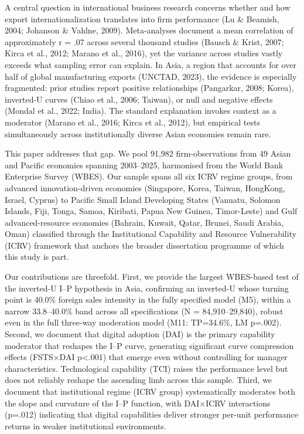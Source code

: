 \documentclass[
  12pt,a4paper]{article}
\begin{document}
A central question in international business research concerns whether
and how export internationalization translates into firm performance (Lu
\& Beamish, 2004; Johanson \& Vahlne, 2009). Meta-analyses document a
mean correlation of approximately r = .07 across several thousand
studies (Bausch \& Krist, 2007; Kirca et al., 2012; Marano et al.,
2016), yet the variance across studies vastly exceeds what sampling
error can explain. In Asia, a region that accounts for over half of
global manufacturing exports (UNCTAD, 2023), the evidence is especially
fragmented: prior studies report positive relationships (Pangarkar,
2008; Korea), inverted-U curves (Chiao et al., 2006; Taiwan), or null
and negative effects (Mondal et al., 2022; India). The standard
explanation invokes context as a moderator (Marano et al., 2016; Kirca
et al., 2012), but empirical tests simultaneously across institutionally
diverse Asian economies remain rare.

This paper addresses that gap. We pool 91,982 firm-observations from 49
Asian and Pacific economies spanning 2003--2025, harmonised from the
World Bank Enterprise Survey (WBES). Our sample spans all six ICRV
regime groups, from advanced innovation-driven economies (Singapore,
Korea, Taiwan, HongKong, Israel, Cyprus) to Pacific Small Island
Developing States (Vanuatu, Solomon Islands, Fiji, Tonga, Samoa,
Kiribati, Papua New Guinea, Timor-Leste) and Gulf advanced-resource
economies (Bahrain, Kuwait, Qatar, Brunei, Saudi Arabia, Oman)
classified through the Institutional Capability and Resource
Vulnerability (ICRV) framework that anchors the broader dissertation
programme of which this study is part.

Our contributions are threefold. First, we provide the largest
WBES-based test of the inverted-U I--P hypothesis in Asia, confirming an
inverted-U whose turning point is 40.0\% foreign sales intensity in the
fully specified model (M5), within a narrow 33.8--40.0\% band across all
specifications (N = 84,910--29,840), robust even in the full three-way
moderation model (M11: TP=34.6\%, LM p=.002). Second, we document that
digital adoption (DAI) is the primary capability moderator that reshapes
the I--P curve, generating significant curve compression effects
(FSTS×DAI p\textless.001) that emerge even without controlling for
manager characteristics. Technological capability (TCI) raises the
performance level but does not reliably reshape the ascending limb
across this sample. Third, we document that institutional regime (ICRV
group) systematically moderates both the slope and curvature of the I--P
function, with DAI×ICRV interactions (p=.012) indicating that digital
capabilities deliver stronger per-unit performance returns in weaker
institutional environments.
\end{document}
